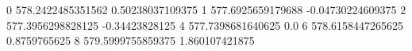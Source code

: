0 578.2422485351562 0.50238037109375
1 577.6925659179688 -0.04730224609375
2 577.3956298828125 -0.34423828125
4 577.7398681640625 0.0
6 578.6158447265625 0.8759765625
8 579.5999755859375 1.860107421875
